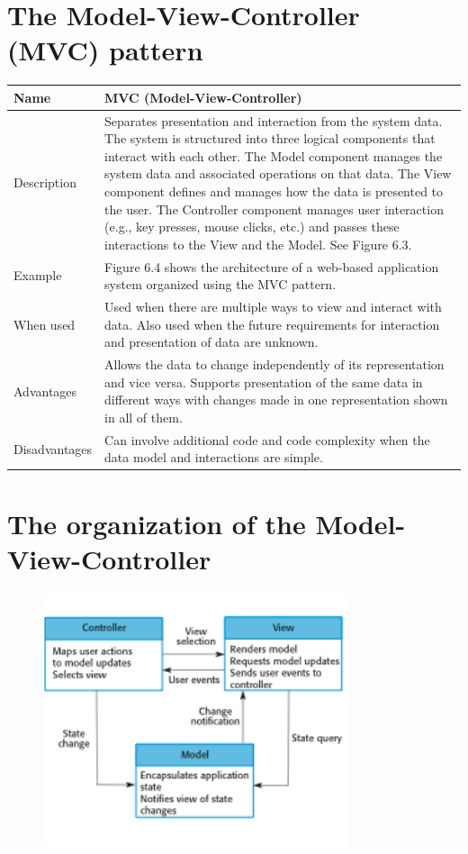 \section{The Model-View-Controller (MVC) pattern}

\begin{table}[h!]
\centering
\begin{tabular}{ |p{3cm}|p{8cm}|  }
\hline
Name & MVC (Model-View-Controller) \\
\hline
\hline
Description & Separates presentation and interaction from the system data. The system is structured into three logical components that interact with each other. The Model component manages the system data and associated operations on that data. The View component defines and manages how the data is presented to the user. The Controller component manages user interaction (e.g., key presses, mouse clicks, etc.) and passes these interactions to the View and the Model. See Figure 6.3.\\
\hline
Example & Figure 6.4 shows the architecture of a web-based application system organized using the MVC pattern.\\
\hline
When used & Used when there are multiple ways to view and interact with data. Also used when the future requirements for interaction and presentation of data are unknown.\\
\hline
Advantages & Allows the data to change independently of its representation and vice versa. Supports presentation of the same data in different ways with changes made in one representation shown in all of them.\\
\hline
Disadvantages & Can involve additional code and code complexity when the data model and interactions are simple.\\
\hline
\end{tabular}

\label{table:T2_3}
\end{table}
\section{The organization of the Model-View-Controller}
\begin{figure}[h!]
    \centering
    \includegraphics[width = 0.8\textwidth]{./figures/L3_2.png}
    \caption{}
    \label{fig:L3_2}
\end{figure}
\newpage

